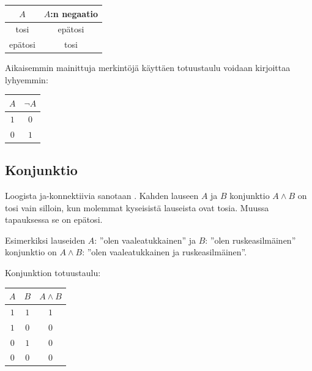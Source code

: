 
\bigskip

\begin{center}
\begin{tabular}{|c|c|}\hline
$A$ & $A$:n negaatio \\ \hline
tosi & epätosi \\ 
epätosi & tosi \\
\hline
\end{tabular}
\end{center}

\bigskip

Aikaisemmin mainittuja merkintöjä käyttäen totuustaulu voidaan kirjoittaa lyhyemmin:

\bigskip

\begin{center}
\begin{tabular}{|c|c|}\hline
$A$ & $\lnot A$ \\ \hline
$1$ & $0$\\ 
$0$ & $1$ \\ \hline
\end{tabular}
\end{center}

\bigskip

\subsection*{Konjunktio}
Loogista ja-konnektiivia sanotaan . Kahden lauseen $A$ ja $B$ konjunktio $A\land B$ on tosi vain silloin, kun molemmat kyseisistä lauseista ovat tosia. Muussa tapauksessa se on epätosi.

Esimerkiksi lauseiden $A$: ''olen vaaleatukkainen'' ja $B$: ''olen ruskeasilmäinen'' konjunktio on $A \land B$: ''olen vaaleatukkainen ja ruskeasilmäinen''. 

Konjunktion totuustaulu:

\bigskip

\begin{center}
\begin{tabular}{|c|c|c|}\hline
$A$ & $B$ & $A\land B$ \\ \hline
$1$ & $1$ & $1$\\ 
$1$ & $0$ & $0$\\
$0$ & $1$ & $0$\\
$0$ & $0$ & $0$\\
\hline
\end{tabular}
\end{center}

